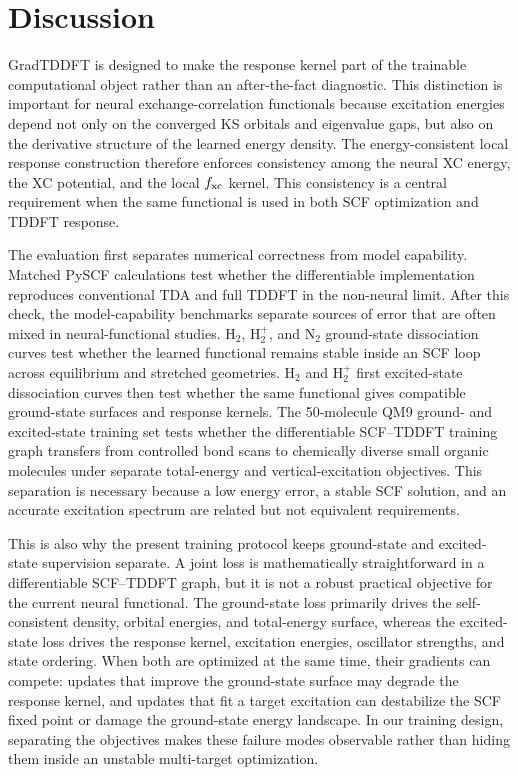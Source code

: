 \section{Discussion}
\label{sec:discussion}

GradTDDFT is designed to make the response kernel part of the
trainable computational object rather than an after-the-fact
diagnostic. This distinction is important for neural
exchange-correlation functionals because excitation energies depend
not only on the converged KS orbitals and eigenvalue gaps, but also
on the derivative structure of the learned energy density. The
energy-consistent local response construction therefore enforces
consistency among the neural XC energy, the XC potential, and the
local $f_{\rm xc}$ kernel.
This consistency is a central requirement when the same functional is
used in both SCF optimization and TDDFT response.

The evaluation first separates numerical correctness from model
capability. Matched PySCF calculations test whether the
differentiable implementation reproduces conventional TDA and full
TDDFT in the non-neural limit. After this check, the model-capability
benchmarks separate sources of error that are often mixed in
neural-functional studies. H$_2$, H$_2^+$, and N$_2$ ground-state
dissociation curves test whether the learned functional remains
stable inside an SCF loop across equilibrium and stretched
geometries. H$_2$ and H$_2^+$ first excited-state dissociation curves
then test whether the same functional gives compatible ground-state
surfaces and response kernels. The 50-molecule QM9
ground- and excited-state training set tests whether the
differentiable SCF--TDDFT training graph transfers from controlled
bond scans to chemically diverse small organic molecules under
separate total-energy and vertical-excitation objectives. This
separation is necessary because a low energy error, a stable SCF
solution, and an accurate excitation spectrum are related but not
equivalent requirements.

This is also why the present training protocol keeps ground-state and
excited-state supervision separate. A joint loss is mathematically
straightforward in a differentiable SCF--TDDFT graph, but it is not a
robust practical objective for the current neural functional. The
ground-state loss primarily drives the self-consistent density,
orbital energies, and total-energy surface, whereas the excited-state
loss drives the response kernel, excitation energies, oscillator
strengths, and state ordering. When both are optimized at the same
time, their gradients can compete: updates that improve the
ground-state surface may degrade the response kernel, and updates that
fit a target excitation can destabilize the SCF fixed point or damage
the ground-state energy landscape. In our training design, separating
the objectives makes these failure modes observable rather than hiding
them inside an unstable multi-target optimization.

